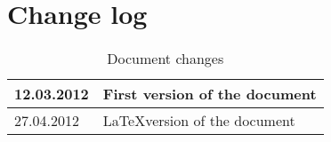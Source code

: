 \section{Change log}

\begin{table}[H]
\begin{tabular}{| p{} | p{} |} \hline
12.03.2012 & First version of the document \\ \hline
27.04.2012 & \LaTeX version of the document \\ \hline
\end{tabular}
\caption{Document changes}
\end{table}




